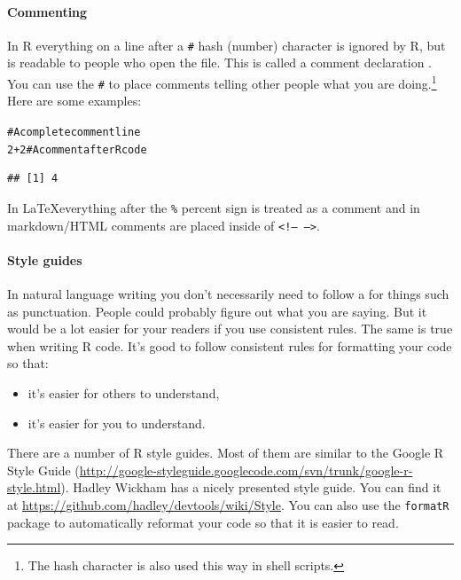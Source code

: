 \documentclass[ChapterTOCs,krantz1]{krantz}\usepackage{graphicx, color}
\makeatletter
\newcommand{\hlcomment}[1]{\textcolor[rgb]{0.180392156862745,0.6,0.341176470588235}{#1}}%
\newenvironment{kframe}{%
 \def\at@end@of@kframe{}%
 \ifinner\ifhmode%
  \def\at@end@of@kframe{\end{minipage}}%
  \begin{minipage}{\columnwidth}%
 \fi\fi%
 \def\FrameCommand##1{\hskip\@totalleftmargin \hskip-\fboxsep
 \colorbox{shadecolor}{##1}\hskip-\fboxsep
     \hskip-\linewidth \hskip-\@totalleftmargin \hskip\columnwidth}%
 \MakeFramed {\advance\hsize-\width
   \@totalleftmargin\z@ \linewidth\hsize
   \@setminipage}}%
 {\par\unskip\endMakeFramed%
 \at@end@of@kframe}
\newenvironment{knitrout}{}{} %
\makeatother
\begin{document}
\paragraph{Commenting}
In R everything on a line after a {\tt{#}} hash (number) character is ignored by R, but is readable to people who open the file. This is called a comment declaration . You can use the {\tt{#}} to place comments telling other people what you are doing.\footnote{The hash character is also used this way in shell scripts.} Here are some examples:

\begin{knitrout}
\color{fgcolor}\begin{kframe}
\begin{alltt}
\hlcomment{# A complete comment line}
2 + 2  \hlcomment{# A comment after R code}
\end{alltt}
\begin{verbatim}
## [1] 4
\end{verbatim}
\end{kframe}
\end{knitrout}


\noindent In \LaTeX everything after the {\tt{\%}} percent sign is treated as a comment and in markdown/HTML comments are placed inside of {\tt{\textless !-- --\textgreater}}.

\paragraph{Style guides}
In natural language writing you don't necessarily need to follow a  for things such as punctuation. People could probably figure out what you are saying. But it would be a lot easier for your readers if you use consistent rules. The same is true when writing R code. It's good to follow consistent rules for formatting your code so that:

\begin{itemize}
    \item it's easier for others to understand,
    \item it's easier for you to understand.
\end{itemize}

There are a number of R style guides. Most of them are similar to the Google R Style Guide  (\url{http://google-styleguide.googlecode.com/svn/trunk/google-r-style.html}). Hadley Wickham  has a nicely presented style guide. You can find it at \url{https://github.com/hadley/devtools/wiki/Style}. You can also use the {\tt{formatR}}  package to automatically reformat your code so that it is easier to read.
\end{document}
